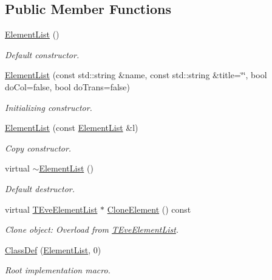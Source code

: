 \subsection*{Public Member Functions}
\begin{DoxyCompactItemize}
\item 
\hyperlink{class_d_d4hep_1_1_element_list_add023eff52a3dc205c33891c200cace1}{Element\+List} ()
\begin{DoxyCompactList}\small\item\em Default constructor. \end{DoxyCompactList}\item 
\hyperlink{class_d_d4hep_1_1_element_list_a9ac013ec9cc0b96d6c31e19401765833}{Element\+List} (const std\+::string \&name, const std\+::string \&title=\char`\"{}\char`\"{}, bool do\+Col=false, bool do\+Trans=false)
\begin{DoxyCompactList}\small\item\em Initializing constructor. \end{DoxyCompactList}\item 
\hyperlink{class_d_d4hep_1_1_element_list_a573686af3429e4ddceac2062f16d704f}{Element\+List} (const \hyperlink{class_d_d4hep_1_1_element_list}{Element\+List} \&l)
\begin{DoxyCompactList}\small\item\em Copy constructor. \end{DoxyCompactList}\item 
virtual \hyperlink{class_d_d4hep_1_1_element_list_a400de029850c5e46b89d0178b0a5f7dc}{$\sim$\+Element\+List} ()
\begin{DoxyCompactList}\small\item\em Default destructor. \end{DoxyCompactList}\item 
virtual \hyperlink{class_t_eve_element_list}{T\+Eve\+Element\+List} $\ast$ \hyperlink{class_d_d4hep_1_1_element_list_a91e498a497b9d4be48504f674c864cd5}{Clone\+Element} () const
\begin{DoxyCompactList}\small\item\em Clone object\+: Overload from \hyperlink{class_t_eve_element_list}{T\+Eve\+Element\+List}. \end{DoxyCompactList}\item 
\hyperlink{class_d_d4hep_1_1_element_list_a857af85f3fb5d9fd07519c846100f841}{Class\+Def} (\hyperlink{class_d_d4hep_1_1_element_list}{Element\+List}, 0)
\begin{DoxyCompactList}\small\item\em Root implementation macro. \end{DoxyCompactList}\end{DoxyCompactItemize}


